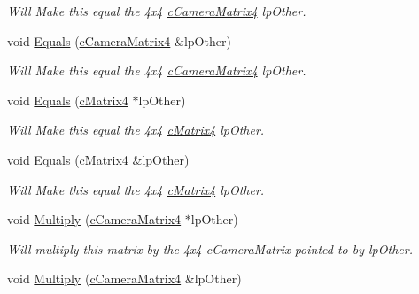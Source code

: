 \begin{DoxyCompactItemize}
\begin{DoxyCompactList}\small\item\em Will Make this equal the 4x4 \hyperlink{classc_camera_matrix4}{cCameraMatrix4} lpOther. \end{DoxyCompactList}\item 
\hypertarget{classc_camera_matrix4_a6ef73d4d654a0dcf9ffc146908bd88ed}{
void \hyperlink{classc_camera_matrix4_a6ef73d4d654a0dcf9ffc146908bd88ed}{Equals} (\hyperlink{classc_camera_matrix4}{cCameraMatrix4} \&lpOther)}
\label{classc_camera_matrix4_a6ef73d4d654a0dcf9ffc146908bd88ed}

\begin{DoxyCompactList}\small\item\em Will Make this equal the 4x4 \hyperlink{classc_camera_matrix4}{cCameraMatrix4} lpOther. \end{DoxyCompactList}\item 
\hypertarget{classc_camera_matrix4_ab6b4ff506c700a7e209dae84eb52d4ef}{
void \hyperlink{classc_camera_matrix4_ab6b4ff506c700a7e209dae84eb52d4ef}{Equals} (\hyperlink{classc_matrix4}{cMatrix4} $\ast$lpOther)}
\label{classc_camera_matrix4_ab6b4ff506c700a7e209dae84eb52d4ef}

\begin{DoxyCompactList}\small\item\em Will Make this equal the 4x4 \hyperlink{classc_matrix4}{cMatrix4} lpOther. \end{DoxyCompactList}\item 
\hypertarget{classc_camera_matrix4_a21037a9e876362aea2c9461f38e50304}{
void \hyperlink{classc_camera_matrix4_a21037a9e876362aea2c9461f38e50304}{Equals} (\hyperlink{classc_matrix4}{cMatrix4} \&lpOther)}
\label{classc_camera_matrix4_a21037a9e876362aea2c9461f38e50304}

\begin{DoxyCompactList}\small\item\em Will Make this equal the 4x4 \hyperlink{classc_matrix4}{cMatrix4} lpOther. \end{DoxyCompactList}\item 
\hypertarget{classc_camera_matrix4_a3856050392bac0f5391a280acc7e1f45}{
void \hyperlink{classc_camera_matrix4_a3856050392bac0f5391a280acc7e1f45}{Multiply} (\hyperlink{classc_camera_matrix4}{cCameraMatrix4} $\ast$lpOther)}
\label{classc_camera_matrix4_a3856050392bac0f5391a280acc7e1f45}

\begin{DoxyCompactList}\small\item\em Will multiply this matrix by the 4x4 cCameraMatrix pointed to by lpOther. \end{DoxyCompactList}\item 
\hypertarget{classc_camera_matrix4_a7a539cb44fa348ad19408ddcb928c49c}{
void \hyperlink{classc_camera_matrix4_a7a539cb44fa348ad19408ddcb928c49c}{Multiply} (\hyperlink{classc_camera_matrix4}{cCameraMatrix4} \&lpOther)}
\label{classc_camera_matrix4_a7a539cb44fa348ad19408ddcb928c49c}


\end{DoxyCompactItemize}
